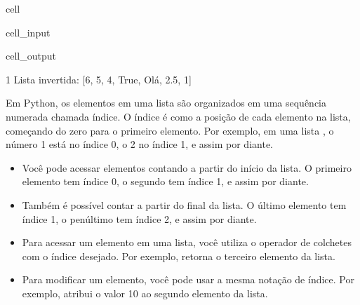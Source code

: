 \documentclass[letterpaper,10pt,english]{jupyterBook}
\begin{document}
\begin{sphinxuseclass}{cell}
\begin{sphinxVerbatimInput}
\begin{sphinxuseclass}{cell_input}
\end{sphinxuseclass}\end{sphinxVerbatimInput}
\begin{sphinxVerbatimOutput}

\begin{sphinxuseclass}{cell_output}
\begin{sphinxVerbatim}
1
Lista invertida: [6, 5, 4, True, \PYGZsq{}Olá\PYGZsq{}, 2.5, 1]
\end{sphinxVerbatim}

\end{sphinxuseclass}\end{sphinxVerbatimOutput}

\end{sphinxuseclass}
\sphinxAtStartPar
Em Python, os elementos em uma lista são organizados em uma sequência numerada chamada índice. O índice é como a posição de cada elemento na lista, começando do zero para o primeiro elemento. Por exemplo, em uma lista \sphinxcode{\sphinxupquote{{[}1, 2, 3, 4{]}}}, o número 1 está no índice 0, o 2 no índice 1, e assim por diante.

\sphinxAtStartPar
{}
\begin{itemize}
\item {} 
\sphinxAtStartPar
{} Você pode acessar elementos contando a partir do início da lista. O primeiro elemento tem índice 0, o segundo tem índice 1, e assim por diante.

\item {} 
\sphinxAtStartPar
{} Também é possível contar a partir do final da lista. O último elemento tem índice \sphinxhyphen{}1, o penúltimo tem índice \sphinxhyphen{}2, e assim por diante.

\end{itemize}

\sphinxAtStartPar
{}
\begin{itemize}
\item {} 
\sphinxAtStartPar
Para acessar um elemento em uma lista, você utiliza o operador de colchetes \sphinxcode{\sphinxupquote{{[}{]}}} com o índice desejado. Por exemplo,  retorna o terceiro elemento da lista.

\item {} 
\sphinxAtStartPar
Para modificar um elemento, você pode usar a mesma notação de índice. Por exemplo,  atribui o valor 10 ao segundo elemento da lista.

\end{itemize}
\end{document}
